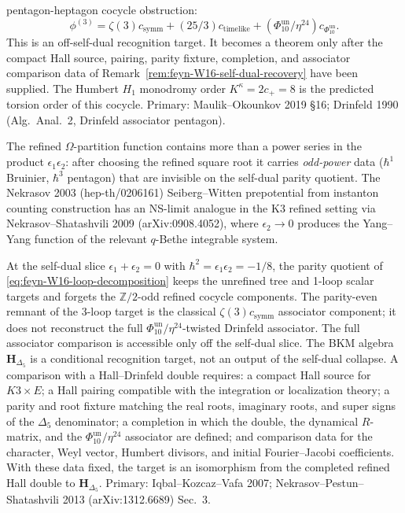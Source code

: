 \begin{remark}
\begin{itemize}
 pentagon-heptagon cocycle obstruction:
 \[
 \phi^{(3)} =
 \zeta(3)c_{\mathrm{symm}} + (25/3)c_{\mathrm{timelike}}
 +(\Phi_{10}^{\mathrm{un}}/\eta^{24})
 c_{\Phi_{10}^{\mathrm{un}}}.
 \]
 This is an off-self-dual recognition target.  It becomes a theorem only
 after the compact Hall source, pairing, parity fixture, completion, and
 associator comparison data of
 Remark~\ref{rem:feyn-W16-self-dual-recovery} have been supplied.  The
 Humbert $H_1$ monodromy order $K^\kappa=2c_+=8$ is the predicted
 torsion order of this cocycle. Primary: Maulik--Okounkov 2019 \S16;
 Drinfeld 1990 (Alg.~Anal.~2, Drinfeld associator pentagon).
\end{itemize}
The refined $\Omega$-partition function contains more than a
power series in the product $\epsilon_1\epsilon_2$: after choosing the
refined square root it carries \emph{odd-power} data
($\hbar^1$ Bruinier, $\hbar^3$ pentagon) that are invisible on the
self-dual parity quotient. The Nekrasov 2003 (hep-th/0206161)
Seiberg--Witten prepotential from instanton counting construction
has an NS-limit analogue in the K3 refined setting via
Nekrasov--Shatashvili 2009 (arXiv:0908.4052), where
$\epsilon_2\to0$ produces the Yang--Yang function of the relevant
$q$-Bethe integrable system.
\end{remark}

\begin{remark}
\label{rem:feyn-W16-self-dual-recovery}
At the self-dual slice $\epsilon_1 + \epsilon_2 = 0$ with
$\hbar^2 = \epsilon_1 \epsilon_2 = -1/8$, the parity quotient of
\eqref{eq:feyn-W16-loop-decomposition} keeps the unrefined tree and
1-loop scalar targets and forgets the $\mathbb Z/2$-odd refined
cocycle components.  The parity-even remnant of the 3-loop target is
the classical $\zeta(3)c_{\mathrm{symm}}$ associator component; it does
not reconstruct the full
$\Phi_{10}^{\mathrm{un}}/\eta^{24}$-twisted Drinfeld associator. The
full associator comparison is accessible only off the self-dual slice.
The BKM algebra
 $\mathbf H_{\Delta_5}$ is a conditional recognition target, not an output of
 the self-dual collapse. A comparison with a Hall--Drinfeld double requires:
 a compact Hall source for $K3\times E$; a Hall pairing compatible with the
 integration or localization theory; a parity and root fixture matching the
 real roots, imaginary roots, and super signs of the $\Delta_5$ denominator;
 a completion in which the double, the dynamical $R$-matrix, and the
 $\Phi_{10}^{\mathrm{un}}/\eta^{24}$ associator are defined; and comparison
 data for the character, Weyl vector, Humbert divisors, and initial
 Fourier--Jacobi coefficients. With these data fixed, the target is an
 isomorphism from the completed refined Hall double to
 $\mathbf H_{\Delta_5}$. Primary: Iqbal--Kozcaz--Vafa 2007;
Nekrasov--Pestun--Shatashvili 2013 (arXiv:1312.6689) Sec.~3.
\end{remark}

